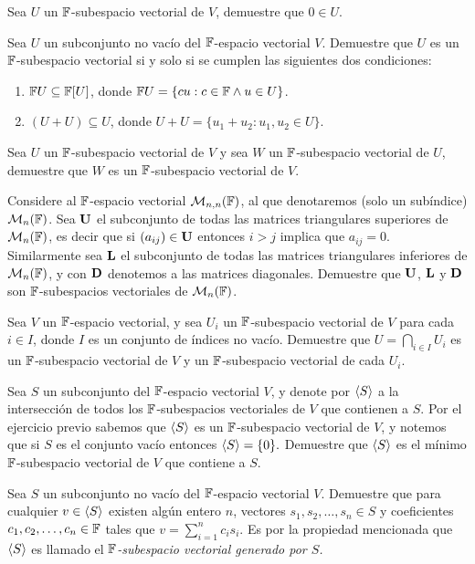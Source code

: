 \begin{exerciselist}
  \item Sea $U$ un $\mathbb{F}$-subespacio vectorial de $V$, demuestre que $0 \in U$.
  
  \item Sea $U$ un subconjunto no vacío del $\mathbb{F}$-espacio vectorial $V$. Demuestre que $U$ es un $\mathbb{F}$-subespacio vectorial si y solo si se cumplen las siguientes dos condiciones:
    \begin{enumerate}
      \item $\mathbb{F} U \subseteq \mathbb{F}[U]$, donde $\mathbb{F} U = \{cu : c \in \mathbb{F} \land u \in U\}$.
      \item $(U + U) \subseteq U$, donde $U+U = \{u_1 + u_2 \colon u_1, u_2 \in U\}$.
    \end{enumerate}

  \item Sea $U$ un $\mathbb{F}$-subespacio vectorial de $V$ y sea $W$ un $\mathbb{F}$-subespacio vectorial de $U$, demuestre que $W$ es un $\mathbb{F}$-subespacio vectorial de $V$.
  
  \item \label{exer:MatULD} Considere al $\mathbb{F}$-espacio vectorial $\mathcal{M}_{n,n} ( \mathbb{F} )$, al que denotaremos (solo un subíndice) $\mathcal{M}_n(\mathbb{F})$. Sea $\mathbf{U}$ el subconjunto de todas las matrices triangulares superiores de $\mathcal{M}_n(\mathbb{F})$, es decir que si $(a_{ij}) \in \mathbf{U}$ entonces $i > j$ implica que $a_{ij} = 0$. Similarmente sea $\mathbf{L}$ el subconjunto de todas las matrices triangulares inferiores de $\mathcal{M}_n(\mathbb{F})$, y con $\mathbf{D}$ denotemos a las matrices diagonales. Demuestre que $\mathbf{U}$, $\mathbf{L}$ y $\mathbf{D}$ son $\mathbb{F}$-subespacios vectoriales de $\mathcal{M}_n(\mathbb{F})$.
  
  \item Sea $V$ un $\mathbb{F}$-espacio vectorial, y sea $U_i$ un $\mathbb{F}$-subespacio vectorial de $V$ para cada $i \in I$, donde $I$ es un conjunto de índices no vacío. Demuestre que $U = \bigcap_{i \in I} U_i$ es un $\mathbb{F}$-subespacio vectorial de $V$ y un $\mathbb{F}$-subespacio vectorial de cada $U_i$.
  
  \item Sea $S$ un subconjunto del $\mathbb{F}$-espacio vectorial $V$, y denote por $\langle S\rangle$ a la intersección de todos los $\mathbb{F}$-subespacios vectoriales de $V$ que contienen a $S$. Por el ejercicio previo sabemos que $\langle S\rangle$ es un $\mathbb{F}$-subespacio vectorial de $V$, y notemos que si $S$ es el conjunto vacío entonces $\langle S\rangle = \{ 0 \}.$ Demuestre que $\langle S\rangle$ es el mínimo $\mathbb{F}$-subespacio vectorial de $V$ que contiene a $S$.
  
  \item Sea $S$ un subconjunto no vacío del $\mathbb{F}$-espacio vectorial $V$. Demuestre que para cualquier $v \in \langle S\rangle$ existen algún entero $n$, vectores $s_1, s_2, \ldots, s_n \in S$ y coeficientes $c_1, c_2, \ldots, c_n \in \mathbb{F}$ tales que $v = \sum _{i=1}^n c_i s_i$. Es por la propiedad mencionada que $\langle S\rangle$ es llamado el \emph{$\mathbb{F}$-subespacio vectorial generado por $S$.}
  


\end{exerciselist}
